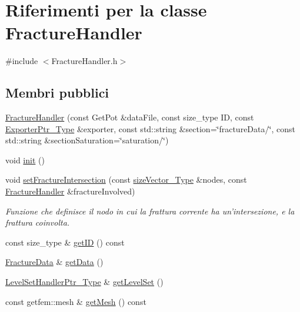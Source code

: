 \hypertarget{classFractureHandler}{\section{Riferimenti per la classe Fracture\-Handler}
\label{classFractureHandler}
}


{\ttfamily \#include $<$Fracture\-Handler.\-h$>$}

\subsection*{Membri pubblici}
\begin{DoxyCompactItemize}
\item 
\hyperlink{classFractureHandler_a75d39ff5fed50df17ab859eff0ff3958}{Fracture\-Handler} (const Get\-Pot \&data\-File, const size\-\_\-type I\-D, const \hyperlink{Exporter_8h_ac9d7f94fea8b91459a536bfaa2f3910c}{Exporter\-Ptr\-\_\-\-Type} \&exporter, const std\-::string \&section=\char`\"{}fracture\-Data/\char`\"{}, const std\-::string \&section\-Saturation=\char`\"{}saturation/\char`\"{})
\item 
void \hyperlink{classFractureHandler_aa28ce054ba2a2679214956c71f8cf1e0}{init} ()
\item 
void \hyperlink{classFractureHandler_a391031a951667a3d8b2f633602856ee3}{set\-Fracture\-Intersection} (const \hyperlink{Core_8h_a83c51913d041a5001e8683434c09857f}{size\-Vector\-\_\-\-Type} \&nodes, const \hyperlink{classFractureHandler}{Fracture\-Handler} \&fracture\-Involved)
\begin{DoxyCompactList}\small\item\em Funzione che definisce il nodo in cui la frattura corrente ha un'intersezione, e la frattura coinvolta. \end{DoxyCompactList}\item 
const size\-\_\-type \& \hyperlink{classFractureHandler_a439092fd58fa5d3295bffb71861cf7b9}{get\-I\-D} () const 
\item 
\hyperlink{classFractureData}{Fracture\-Data} \& \hyperlink{classFractureHandler_a68ed77a8d9816a472700ee4bcf2f505d}{get\-Data} ()
\item 
\hyperlink{LevelSetHandler_8h_aba343569cb3213c103252f69c39cad0b}{Level\-Set\-Handler\-Ptr\-\_\-\-Type} \& \hyperlink{classFractureHandler_af37ab12a17f812a960da2aa71699ba0f}{get\-Level\-Set} ()
\item 
const getfem\-::mesh \& \hyperlink{classFractureHandler_ac46642070f0dc03d8db9ef1844129f74}{get\-Mesh} () const 

\end{DoxyCompactItemize}

